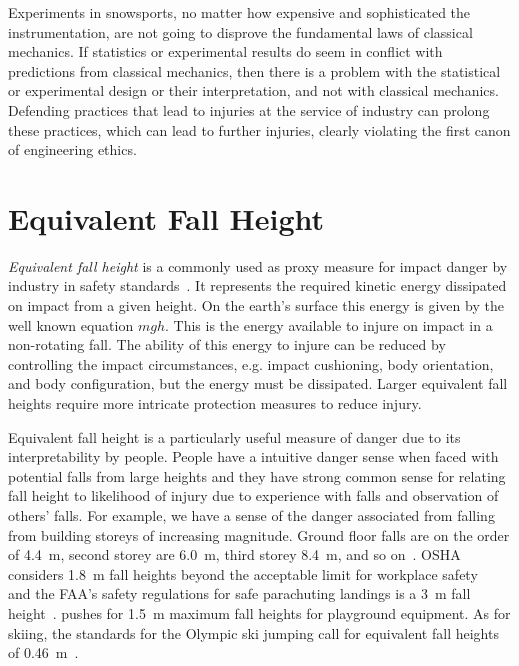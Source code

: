 \documentclass{article}
\begin{document}
Experiments in snowsports, no matter how expensive and sophisticated the
instrumentation, are not going to disprove the fundamental laws of classical
mechanics. If statistics or experimental results do seem in conflict with
predictions from classical mechanics, then there is a problem with the
statistical or experimental design or their interpretation, and not with
classical mechanics. Defending practices that lead to injuries at the service
of industry can prolong these practices, which can lead to further injuries,
clearly violating the first canon of engineering ethics.

\section{Equivalent Fall Height}
%
\emph{Equivalent fall height} is a commonly used as proxy measure for impact
danger by industry in safety standards~\cite{Hubbard2012}. It represents the
required kinetic energy dissipated on impact from a given height. On the
earth's surface this energy is given by the well known equation $mgh$. This is
the energy available to injure on impact in a non-rotating fall. The ability of
this energy to injure can be reduced by controlling the impact circumstances,
e.g. impact cushioning, body orientation, and body configuration, but the
energy must be dissipated. Larger equivalent fall heights require more
intricate protection measures to reduce injury.

Equivalent fall height is a particularly useful measure of danger due to its
interpretability by people. People have a intuitive danger sense when faced
with potential falls from large heights and they have strong common sense for
relating fall height to likelihood of injury due to experience with falls and
observation of others' falls. For example, we have a sense of the danger
associated from falling from building storeys of increasing magnitude. Ground
floor falls are on the order of 4.4~\si{\meter}, second storey are
6.0~\si{\meter}, third storey 8.4~\si{\meter}, and so on~\cite{Vish2005}. OSHA
considers 1.8~\si{\meter} fall heights beyond the acceptable limit for
workplace safety~ and the FAA's safety regulations for safe
parachuting landings is a 3~\si{\meter} fall height~.
\cite{Chalmers1996} pushes for 1.5~\si{\meter} maximum fall heights for
playground equipment. As for skiing, the standards for the Olympic ski jumping
call for equivalent fall heights of 0.46~\si{\meter}~.
\end{document}
